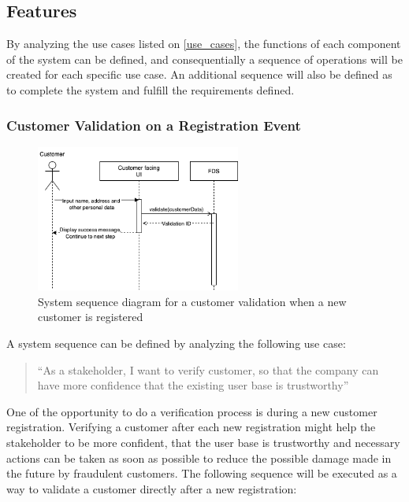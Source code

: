 \subsection{Features}
 \label{subsection:controller}

 By analyzing the use cases listed on \autoref{use_cases}, the functions of each component of the system can be defined, and consequentially a sequence of operations will be created for each specific use case. An additional sequence will also be defined as to complete the system and fulfill the requirements defined. 

\subsubsection{Customer Validation on a Registration Event}
 \label{subsection:regis}

\begin{figure}[!ht]
  \centering
  \includegraphics[width=0.6\textwidth]{diagrams/sequence-registration.png}
  \caption{System sequence diagram for a customer validation when a new customer is registered}
  \label{fig:regis-sequence}
\end{figure}

A system sequence can be defined by analyzing the following use case:

\begin{quotation}
 \enquote{As a stakeholder, I want to verify customer, so that the company can have more confidence that the existing user base is trustworthy} 
\end{quotation}

One of the opportunity to do a verification process is during a new customer registration. Verifying a customer after each new registration might help the stakeholder to be more confident, that the user base is trustworthy and necessary actions can be taken as soon as possible to reduce the possible damage made in the future by fraudulent customers. The following sequence will be executed as a way to validate a customer directly after a new registration:

